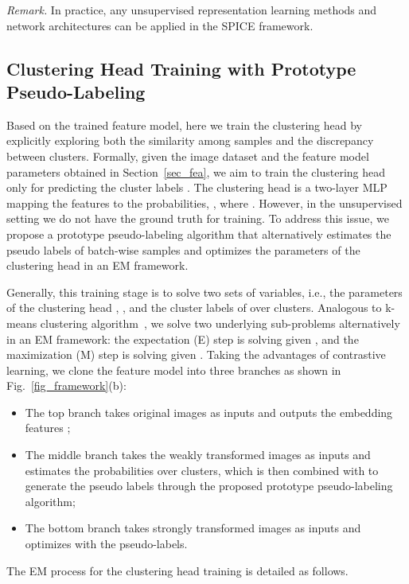 \documentclass[journal]{IEEEtran}
\begin{document}
\noindent\emph{Remark.} In practice, any unsupervised representation learning methods and network architectures can be applied in the SPICE framework. 


\subsection{Clustering Head Training with Prototype Pseudo-Labeling}
\label{sec_proto}

Based on the trained feature model, here we train the clustering head by explicitly exploring both the similarity among samples and the discrepancy between clusters. 
Formally, given the image dataset  and the feature model parameters  obtained in Section~\ref{sec_fea}, we aim to train the clustering head only for predicting the cluster labels .
The clustering head  is a two-layer MLP mapping the features to the probabilities, , where .
However, in the unsupervised setting we do not have the ground truth for training.
To address this issue, we propose a prototype pseudo-labeling algorithm that alternatively estimates the pseudo labels of batch-wise samples and optimizes the parameters of the clustering head in an EM framework.

Generally, this training stage is to solve two sets of variables, i.e., the parameters of the clustering head , , and the cluster labels  of  over  clusters.
Analogous to k-means clustering algorithm~\cite{kmeans1967}, we solve two underlying sub-problems alternatively in an EM framework: the expectation (E) step is solving  given , and the maximization (M) step is solving  given .
Taking the advantages of contrastive learning, we clone the feature model into three branches as shown in Fig.~\ref{fig_framework}(b):
\begin{itemize}
\item The top branch takes original images as inputs and outputs the embedding features ;
\item The middle branch takes the weakly transformed images as inputs and estimates the probabilities  over  clusters, which is then combined with  to generate the pseudo labels  through the proposed prototype pseudo-labeling algorithm; 
\item The bottom branch takes strongly transformed images as inputs and optimizes  with the pseudo-labels. \end{itemize}





The EM process for the clustering head training is  detailed as follows. 
\end{document}
